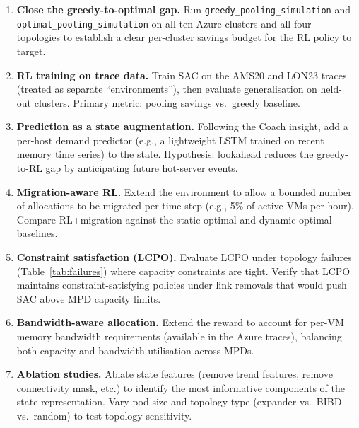 \documentclass[11pt]{article}
\begin{document}
\begin{enumerate}
    \item \textbf{Close the greedy-to-optimal gap.}
    Run \texttt{greedy\_pooling\_simulation} and \texttt{optimal\_pooling\_simulation}
    on all ten Azure clusters and all four topologies to establish a clear
    per-cluster savings budget for the RL policy to target.

    \item \textbf{RL training on trace data.}
    Train SAC on the AMS20 and LON23 traces (treated as separate
    ``environments''), then evaluate generalisation on held-out clusters.
    Primary metric: pooling savings vs.\ greedy baseline.

    \item \textbf{Prediction as a state augmentation.}
    Following the Coach insight, add a per-host demand predictor (e.g., a
    lightweight LSTM trained on recent memory time series) to the state.
    Hypothesis: lookahead reduces the greedy-to-RL gap by anticipating
    future hot-server events.

    \item \textbf{Migration-aware RL.}
    Extend the environment to allow a bounded number of allocations to be
    migrated per time step (e.g., 5\% of active VMs per hour).  Compare
    RL+migration against the static-optimal and dynamic-optimal baselines.

    \item \textbf{Constraint satisfaction (LCPO).}
    Evaluate LCPO under topology failures (Table~\ref{tab:failures}) where
    capacity constraints are tight.  Verify that LCPO maintains
    constraint-satisfying policies under link removals that would push SAC
    above MPD capacity limits.

    \item \textbf{Bandwidth-aware allocation.}
    Extend the reward to account for per-VM memory bandwidth requirements
    (available in the Azure traces), balancing both capacity and bandwidth
    utilisation across MPDs.

    \item \textbf{Ablation studies.}
    Ablate state features (remove trend features, remove connectivity mask,
    etc.) to identify the most informative components of the state
    representation.  Vary pod size and topology type (expander vs.\ BIBD
    vs.\ random) to test topology-sensitivity.
\end{enumerate}




\end{document}
